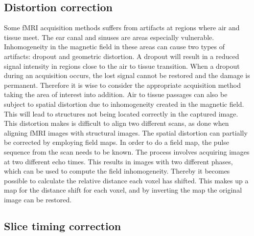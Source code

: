 \subsection{Distortion correction}

Some fMRI acquisition methods suffers from artifacts at regions where air and tissue meet. The ear canal and sinuses are areas especially vulnerable. Inhomogeneity in the magnetic field in these areas can cause two types of artifacts: dropout and geometric distortion. A dropout will result in a reduced signal intensity in regions close to the air to tissue transition. When a dropout during an acquisition occurs, the lost signal cannot be restored and the damage is permanent. Therefore it is wise to consider the appropriate acquisition method taking the area of interest into addition. Air to tissue passages can also be subject to spatial distortion due to inhomogeneity created in the magnetic field. This will lead to structures not being located correctly in the captured image. This distortion makes is difficult to align two different scans, as done when aligning fMRI images with structural images. 
The spatial distortion can partially be corrected by employing field maps. In order to do a field map, the pulse sequence from the scan needs to be known. The process involves acquiring images at two different echo times. This results in images with two different phases, which can be used to compute the field inhomogeneity. Thereby it becomes possible to calculate the relative distance each voxel has shifted. This makes up a map for the distance shift for each voxel, and by inverting the map the original image can be restored. \cite{Poldrack2011}  

\subsection{Slice timing correction} 

